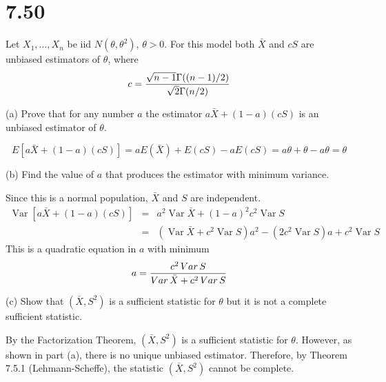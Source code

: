 \section*{7.50}
Let $X_1,\ldots,X_n$ be iid $N(\theta,\theta^2)$, $\theta>0$.
For this model both $\bar X$ and $cS$ are unbiased estimators
of $\theta$, where
$$c={\sqrt{n-1}\Gamma((n-1)/2)\over\sqrt2\Gamma(n/2)}$$

\bigskip
\noindent
(a) Prove that for any number $a$ the estimator
$a\bar X+(1-a)(cS)$ is an unbiased estimator of $\theta$.

\bigskip
\noindent
$$E[a\bar X+(1-a)(cS)]=aE(\bar X)+E(cS)-aE(cS)
=a\theta+\theta-a\theta=\theta$$

\bigskip
\noindent
(b) Find the value of $a$ that produces the estimator with
minimum variance.

\bigskip
\noindent
Since this is a normal population, $\bar X$ and $S$ are independent.
\begin{eqnarray*}
\mathop{Var}[a\bar X+(1-a)(cS)]&=&
a^2\mathop{Var}\bar X+(1-a)^2c^2\mathop{Var}S\\
&=&(\mathop{Var}\bar X+c^2\mathop{Var}S)a^2-(2c^2\mathop{Var}S)a
+c^2\mathop{Var}S
\end{eqnarray*}
This is a quadratic equation in $a$ with minimum
$$a={c^2\mathop{Var}S\over\mathop{Var}\bar X+c^2\mathop{Var}S}$$

\bigskip
\noindent
(c) Show that $(\bar X,S^2)$ is a sufficient statistic for $\theta$
but it is not a complete sufficient statistic.

\bigskip
\noindent
By the Factorization Theorem, $(\bar X,S^2)$
is a sufficient statistic for $\theta$.
However, as shown in part (a), there is no unique unbiased estimator.
Therefore, by Theorem 7.5.1 (Lehmann-Scheffe), the statistic
$(\bar X,S^2)$ cannot be complete.

